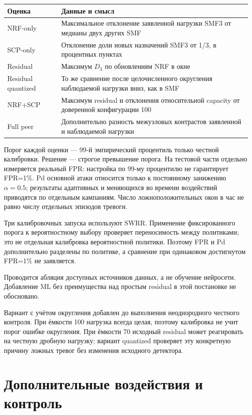 \documentclass[11pt,a4paper]{article}
\begin{document}
{\footnotesize\setlength{\tabcolsep}{3pt}\renewcommand{\arraystretch}{1.25}
\begin{longtable}{p{8.16cm}p{8.16cm}}
\toprule
Оценка & Данные и смысл \\
\midrule\endhead
NRF-only & Максимальное отклонение заявленной нагрузки SMF3 от медианы двух других SMF \\
SCP-only & Отклонение доли новых назначений SMF3 от 1/3, в процентных пунктах \\
Residual & Максимум \(D_3\) по обновлениям NRF в окне \\
Residual quantized & То же сравнение после целочисленного округления наблюдаемой нагрузки вниз, как в SMF \\
NRF+SCP & Максимум residual и отклонения относительной capacity от доверенной конфигурации 100 \\
Full peer & Дополнительно разность межузловых контрастов заявленной и наблюдаемой нагрузки \\
\bottomrule\end{longtable}}

Порог каждой оценки — 99-й эмпирический процентиль только честной калибровки. Решение — строгое превышение порога. На тестовой части отдельно измеряется реальный FPR: настройка по 99-му процентилю не гарантирует FPR=1\%. Pd основной атаки относится только к постоянному занижению \(\alpha=0.5\); результаты адаптивных и меняющихся во времени воздействий приводятся по отдельным кампаниям. Число ложноположительных окон в час не равно числу отдельных эпизодов тревоги.

Три калибровочных запуска используют SWRR. Применение фиксированного порога к вероятностному выбору проверяет переносимость между политиками; это не отдельная калибровка вероятностной политики. Поэтому FPR и Pd дополнительно разделены по политике, а сравнение при одинаковом достигнутом FPR=1\% не заявляется.

Проводится абляция доступных источников данных, а не обучение нейросети. Добавление ML без преимущества над простым residual в этой постановке не обосновано.

Вариант с учётом округления добавлен до выполнения неоднородного честного контроля. При ёмкости 100 нагрузка всегда целая, поэтому калибровка не учит порог ошибке округления. При ёмкости 70 исходный residual может реагировать на честную дробную нагрузку; вариант quantized проверяет эту конкретную причину ложных тревог без изменения исходного детектора.

\section*{Дополнительные воздействия и контроль}
\end{document}
